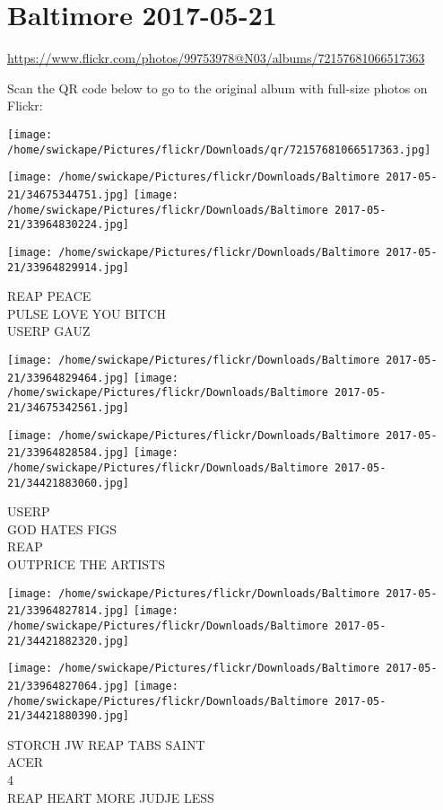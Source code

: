 \documentclass[10pt,letterpaper]{article}
\title{}
\author{}
\date{}
\begin{document}
\section*{Baltimore 2017-05-21}

\url{https://www.flickr.com/photos/99753978@N03/albums/72157681066517363}

Scan the QR code below to go to the original album with full-size photos on Flickr:

\texttt{[image: /home/swickape/Pictures/flickr/Downloads/qr/72157681066517363.jpg]}
\pagebreak

\texttt{[image: /home/swickape/Pictures/flickr/Downloads/Baltimore 2017-05-21/34675344751.jpg]}
\texttt{[image: /home/swickape/Pictures/flickr/Downloads/Baltimore 2017-05-21/33964830224.jpg]}

\vspace{0.25in}
\texttt{[image: /home/swickape/Pictures/flickr/Downloads/Baltimore 2017-05-21/33964829914.jpg]}

REAP PEACE\\
PULSE LOVE YOU BITCH\\
USERP GAUZ
\pagebreak

\texttt{[image: /home/swickape/Pictures/flickr/Downloads/Baltimore 2017-05-21/33964829464.jpg]}
\texttt{[image: /home/swickape/Pictures/flickr/Downloads/Baltimore 2017-05-21/34675342561.jpg]}

\texttt{[image: /home/swickape/Pictures/flickr/Downloads/Baltimore 2017-05-21/33964828584.jpg]}
\texttt{[image: /home/swickape/Pictures/flickr/Downloads/Baltimore 2017-05-21/34421883060.jpg]}

USERP\\
GOD HATES FIGS\\
REAP\\
OUTPRICE THE ARTISTS
\pagebreak

\texttt{[image: /home/swickape/Pictures/flickr/Downloads/Baltimore 2017-05-21/33964827814.jpg]}
\texttt{[image: /home/swickape/Pictures/flickr/Downloads/Baltimore 2017-05-21/34421882320.jpg]}

\texttt{[image: /home/swickape/Pictures/flickr/Downloads/Baltimore 2017-05-21/33964827064.jpg]}
\texttt{[image: /home/swickape/Pictures/flickr/Downloads/Baltimore 2017-05-21/34421880390.jpg]}

STORCH JW REAP TABS SAINT\\
ACER\\
4\\
REAP HEART MORE JUDJE LESS
\pagebreak
\end{document}

